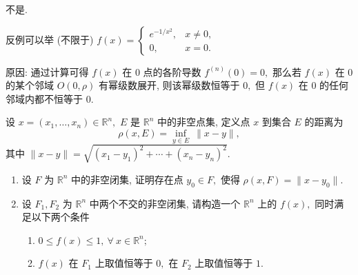 \begin{solution}
不是.

反例可以举 (不限于) $f(x) = \begin{cases}
e^{-1/x^2}, & x \neq 0, \\ 0, & x = 0.
\end{cases}$

原因: {\color{red} 通过计算}可得 $f(x)$ 在 $0$ 点的各阶导数 $f^{(n)}(0) = 0,$ 那么若 $f(x)$ 在 $0$ 的某个邻域 $O(0, \rho)$ 有幂级数展开, 则该幂级数恒等于 $0,$ 但 $f(x)$ 在 $0$ 的任何邻域内都不恒等于 $0.$
\end{solution}


\begin{question}[points = 10]
设 $x = (x_1, \dots, x_n) \in \mathbb{R}^n,$ $E$ 是 $\mathbb{R}^n$ 中的非空点集, 定义点 $x$ 到集合 $E$ 的距离为
$$\rho(x, E) = \inf_{y \in E} ~ \lVert x - y \rVert,$$
其中 $\lVert x - y \rVert = \sqrt{(x_1 - y_1)^2 + \cdots + (x_n - y_n)^2}.$
\begin{enumerate}
\item 设 $F$ 为 $\mathbb{R}^n$ 中的非空闭集, 证明存在点 $y_0 \in F,$ 使得 $\rho(x, F) = \lVert x - y_0 \rVert.$
\item 设 $F_1, F_2$ 为 $\mathbb{R}^n$ 中两个不交的非空闭集, 请构造一个 $\mathbb{R}^n$ 上的 $f(x),$ 同时满足以下两个条件
\begin{enumerate}
\item $0 \leqslant f(x) \leqslant 1, ~ \forall ~ x \in \mathbb{R}^n;$
\item $f(x)$ 在 $F_1$ 上取值恒等于 $0,$ 在 $F_2$ 上取值恒等于 $1.$
\end{enumerate}
\end{enumerate}

\end{question}


